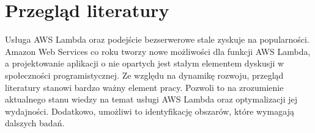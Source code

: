 \chapter{Przegląd literatury}\label{chapter:przeglad_literatury}

Usługa AWS Lambda oraz podejście bezserwerowe stale zyskuje na popularności.
Amazon Web Services co roku tworzy nowe możliwości dla funkcji AWS Lambda, a projektowanie aplikacji o nie opartych jest stałym elementem dyskusji w społeczności programistycznej.
Ze względu na dynamikę rozwoju, przegląd literatury stanowi bardzo ważny element pracy. 
Pozwoli to na zrozumienie aktualnego stanu wiedzy na temat usługi AWS Lambda oraz optymalizacji jej wydajności.
Dodatkowo, umożliwi to identyfikację obszarów, które wymagają dalszych badań.



